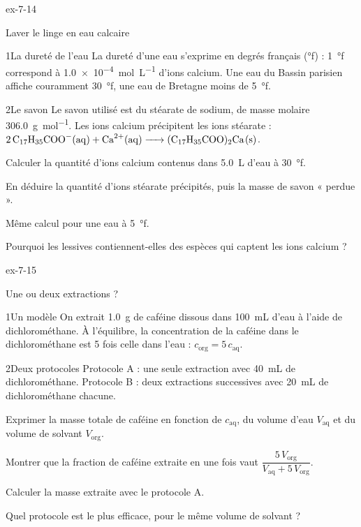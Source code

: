 \begin{blocLivre}{ex-7-14}
\begin{exercice}[3]{Laver le linge en eau calcaire}
\begin{docu}{1}{La dureté de l'eau}
La dureté d'une eau s'exprime en degrés français (°f) : \num{1}~°f correspond à \qty{1,0e-4}{mol.L^{-1}} d'ions calcium. Une eau du
Bassin parisien affiche couramment \num{30}~°f, une eau de Bretagne moins de \num{5}~°f.
\end{docu}
\begin{docu}{2}{Le savon}
Le savon utilisé est du stéarate de sodium, de masse molaire \qty{306,0}{g.mol^{-1}}. Les ions calcium précipitent les ions stéarate :
$\ce{2C17H35COO^{-}(aq) + Ca^{2+}(aq) -> (C17H35COO)2Ca(s)}$.
\end{docu}
\begin{questions}
\item Calculer la quantité d'ions calcium contenus dans \qty{5,0}{L} d'eau à \num{30}~°f.
\item En déduire la quantité d'ions stéarate précipités, puis la masse de savon « perdue ».
\item Même calcul pour une eau à \num{5}~°f.
\item \initiative Pourquoi les lessives contiennent-elles des espèces qui captent les ions calcium ?
\end{questions}
\end{exercice}
\end{blocLivre}
\begin{blocLivre}{ex-7-15}
\begin{exercice}[3]{Une ou deux extractions ?}
\begin{docu}{1}{Un modèle}
On extrait \qty{1,0}{g} de caféine dissous dans \qty{100}{mL} d'eau à l'aide de dichlorométhane. À l'équilibre, la concentration de la
caféine dans le dichlorométhane est 5 fois celle dans l'eau : $c_\text{org}=5\,c_\text{aq}$.
\end{docu}
\begin{docu}{2}{Deux protocoles}
Protocole A : une seule extraction avec \qty{40}{mL} de dichlorométhane. Protocole B : deux extractions successives avec
\qty{20}{mL} de dichlorométhane chacune.
\end{docu}
\begin{questions}
\item Exprimer la masse totale de caféine en fonction de $c_\text{aq}$, du volume d'eau $V_\text{aq}$ et du volume de solvant $V_\text{org}$.
\item Montrer que la fraction de caféine extraite en une fois vaut $\dfrac{5\,V_\text{org}}{V_\text{aq}+5\,V_\text{org}}$.
\item Calculer la masse extraite avec le protocole A.
\item \initiative Quel protocole est le plus efficace, pour le même volume de solvant ?
\end{questions}
\end{exercice}
\end{blocLivre}

